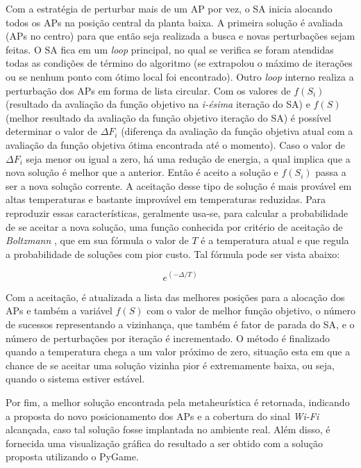 \documentclass[
	12pt,				%
	twoside,			%
	a4paper,			%
	english,			%
	french,				%
	spanish,			%
	brazil				%
	]{abntex2}
\begin{document}
Com a estratégia de perturbar mais de um AP por vez, o SA inicia
alocando todos os APs na posição central da planta baixa. A primeira
solução é avaliada (APs no centro) para que então seja realizada a busca
e novas perturbações sejam feitas. O SA fica em um \emph{loop}
principal, no qual se verifica se foram atendidas todas as condições de
término do algoritmo (se extrapolou o máximo de iterações ou se nenhum
ponto com ótimo local foi encontrado). Outro \emph{loop} interno realiza
a perturbação dos APs em forma de lista circular. Com os valores de
\(f(S_{i})\) (resultado da avaliação da função objetivo na
\emph{i-ésima} iteração do SA) e \(f(S)\) (melhor resultado da avaliação
da função objetivo iteração do SA) é possível determinar o valor de
\(\Delta F_{i}\) (diferença da avaliação da função objetiva atual com a
avaliação da função objetiva ótima encontrada até o momento). Caso o
valor de \(\Delta F_{i}\) seja menor ou igual a zero, há uma redução de
energia, a qual implica que a nova solução é melhor que a anterior.
Então é aceito a solução e \(f(S_{i})\) passa a ser a nova solução
corrente. A aceitação desse tipo de solução é mais provável em altas
temperaturas e bastante improvável em temperaturas reduzidas. Para
reproduzir essas características, geralmente usa-se, para calcular a
probabilidade de se aceitar a nova solução, uma função conhecida por
critério de aceitação de \emph{Boltzmann} \cite{AARTS}, que em sua
fórmula o valor de \(T\) é a temperatura atual e que regula a
probabilidade de soluções com pior custo. Tal fórmula pode ser vista
abaixo:

\begin{equation}
    e^{(-\Delta/T)}
\end{equation}

Com a aceitação, é atualizada a lista das melhores posições para a
alocação dos APs e também a variável \(f(S)\) com o valor de melhor
função objetivo, o número de sucessos representando a vizinhança, que
também é fator de parada do SA, e o número de perturbações por iteração
é incrementado. O método é finalizado quando a temperatura chega a um
valor próximo de zero, situação esta em que a chance de se aceitar uma
solução vizinha pior é extremamente baixa, ou seja, quando o sistema
estiver estável.

Por fim, a melhor solução encontrada pela metaheurística é retornada,
indicando a proposta do novo posicionamento dos APs e a cobertura do
sinal \emph{Wi-Fi} alcançada, caso tal solução fosse implantada no
ambiente real. Além disso, é fornecida uma visualização gráfica do
resultado a ser obtido com a solução proposta utilizando o PyGame.
\end{document}
